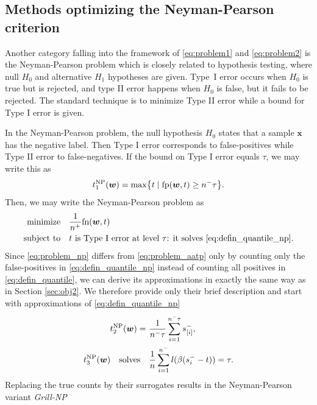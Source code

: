 \documentclass{Thesis}
\newcommand{\Brac}[2][r]{%
  \ifx r#1 \left(       #2 \right)       \else
  \ifx c#1 \left\{      #2 \right\}      \else
  \ifx s#1 \left[       #2 \right]       \else
  \ifx v#1 \left\vert   #2 \right\vert   \else
  \ifx a#1 \left\langle #2 \right\rangle \else
  \ifx t#1 \left\lceil  #2 \right\rceil  \else
  \ifx b#1 \left\lfloor #2 \right\rfloor \else
  \ifx n#1 \left\|      #2 \right\|      \else
  \mathrm{Illegal~option}%
  \fi\fi\fi\fi\fi\fi\fi\fi
}
\newcommand{\minimize}{\operatorname*{minimize}}
\newcommand{\st}{\operatorname{subject\ to}}
\newcommand{\GrillNP}{\emph{Grill-NP}\xspace}
\newcommand{\fp}{\textnormal{fp}}
\newcommand{\fn}{\textnormal{fn}}
\begin{document}
\subsection{Methods optimizing the Neyman-Pearson criterion}\label{sec:obj3}

Another category falling into the framework of \eqref{eq:problem1} and \eqref{eq:problem2} is the Neyman-Pearson problem which is closely related to hypothesis testing, where null $H_0$ and alternative $H_1$ hypotheses are given. Type~I error occurs when $H_0$ is true but is rejected, and type II error happens when $H_0$ is false, but it fails to be rejected. The standard technique is to minimize Type II error while a bound for Type I error is given.

In the Neyman-Pearson problem, the null hypothesis $H_0$ states that a sample $\bm{x}$ has the negative label. Then Type I error corresponds to false-positives while Type II error to false-negatives. If the bound on Type I error equals $\tau$, we may write this as
\begin{equation}\label{eq:defin_quantile_np} 
  t_1^{\rm NP}(\bm{w}) = \max\Brac[c]{t \mid \fp(\bm{w},t) \ge n^- \tau}.
\end{equation}
Then, we may write the Neyman-Pearson problem as
\begin{equation}\label{eq:problem_np}
  \begin{aligned}
    \minimize
    & \quad \frac{1}{n^{+}}\fn(\bm{w},t) \\
    \st
    & \quad t \text{ is Type I error at level \ensuremath{\tau}: it solves }\eqref{eq:defin_quantile_np}.
  \end{aligned}
\end{equation}
Since \eqref{eq:problem_np} differs from \eqref{eq:problem_aatp} only by counting only the false-positives in \eqref{eq:defin_quantile_np} instead of counting all positives in \eqref{eq:defin_quantile}, we can derive its approximations in exactly the same way as in Section \ref{sec:obj2}. We therefore provide only their brief description and start with approximations of \eqref{eq:defin_quantile_np}
\begin{align}
  \label{eq:defin_quantile1_np} t_2^{\rm NP}(\bm{w}) =\ &\frac{1}{n^-\tau}\sum_{i=1}^{n^-\tau} s_{[i]}^-, \\
  \label{eq:defin_quantile0_np} t_3^{\rm NP}(\bm{w})\quad \text{solves} \quad &\frac{1}{n}\sum_{i=1}^{n^-}l(\beta(s_i^- - t)) = \tau.
\end{align}
Replacing the true counts by their surrogates results in the Neyman-Pearson variant \GrillNP
\end{document}
